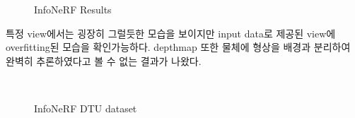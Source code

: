 \documentclass{vipweekly}
\begin{document}
\begin{figure}[h]
    \hfill
    \hfill
    \hfill

    \caption{InfoNeRF Results}
    \label{fig:Results}
\end{figure}

특정 view에서는 굉장히 그럴듯한 모습을 보이지만 input data로 제공된 view에 overfitting된 모습을 확인가능하다. depthmap
또한 물체에 형상을 배경과 분리하여 완벽히 추론하였다고 볼 수 없는 결과가 나왔다.

\begin{figure}[h]
    \centering

    \hfill\\
    \caption{InfoNeRF DTU dataset}
    \label{fig:Infonerf}
\end{figure}
\end{document}
